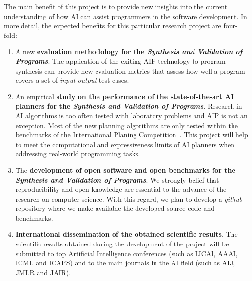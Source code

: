 \documentclass[10pt,a4paper]{paper}
\begin{document}
The main benefit of this project is to provide new insights into the current understanding of how AI can assist programmers in the software development. In more detail, the expected benefits for this particular research project are four-fold:
\begin{enumerate}
\item A new {\bf evaluation methodology for the {\em Synthesis and Validation of Programs}}. The application of the exiting AIP technology to program synthesis can provide new evaluation metrics that assess how well a program covers a set of {\em input-output} test cases.  
\item An empirical {\bf study on the performance of the state-of-the-art AI planners for the {\em Synthesis and Validation of Programs}}. Research in AI algorithms is too often tested with laboratory problems and AIP is not an exception. Most of the new planning algorithms are only tested within the benchmarks of the International Planing Competition~\cite{vallati:IPC:AI15}. This project will help to meet the computational and expressiveness limits of AI planners when addressing real-world programming tasks. 
\item The {\bf development of open software and open benchmarks for the {\em Synthesis and Validation of Programs}}. We strongly belief that reproducibility and open knowledge are essential to the advance of the research on computer science. With this regard, we plan to develop a {\em github} repository where we make available the developed source code and benchmarks.
\item {\bf International dissemination of the obtained scientific results}. The scientific results obtained during the development of the project will be submitted to top Artificial Intelligence conferences (such as IJCAI, AAAI, ICML and ICAPS) and to the main journals in the AI field (such as AIJ, JMLR and JAIR).
\end{enumerate}

\vspace{0.3cm}

\begin{scriptsize}

\end{scriptsize}

\end{document}
